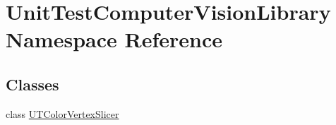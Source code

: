 \hypertarget{namespace_unit_test_computer_vision_library}{}\section{Unit\+Test\+Computer\+Vision\+Library Namespace Reference}
\label{namespace_unit_test_computer_vision_library}
\subsection*{Classes}
\begin{DoxyCompactItemize}
\item 
class \hyperlink{class_unit_test_computer_vision_library_1_1_u_t_color_vertex_slicer}{U\+T\+Color\+Vertex\+Slicer}
\end{DoxyCompactItemize}
